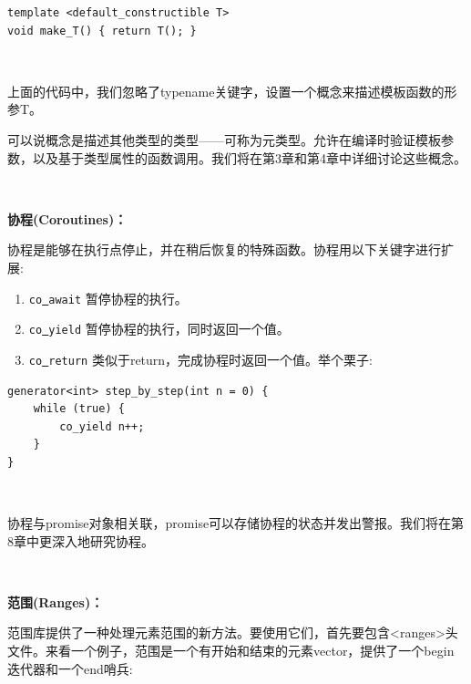 \begin{lstlisting}[caption={}]
template <default_constructible T>
void make_T() { return T(); }
\end{lstlisting}
	
\noindent\textbf{}\ \par
上面的代码中，我们忽略了typename关键字，设置一个概念来描述模板函数的形参T。\par

可以说概念是描述其他类型的类型——可称为元类型。允许在编译时验证模板参数，以及基于类型属性的函数调用。我们将在第3章和第4章中详细讨论这些概念。 \par

\noindent\textbf{}\ \par
\textbf{协程(Coroutines)：}\ \par
协程是能够在执行点停止，并在稍后恢复的特殊函数。协程用以下关键字进行扩展:\par

\begin{enumerate}
	\item \texttt{co\underline{ }await} 暂停协程的执行。
	\item \texttt{co\underline{ }yield} 暂停协程的执行，同时返回一个值。
	\item \texttt{co\underline{ }return} 类似于return，完成协程时返回一个值。举个栗子:
\end{enumerate}


\begin{lstlisting}[caption={}]
generator<int> step_by_step(int n = 0) {
	while (true) {
		co_yield n++;
	}
}
\end{lstlisting}

\noindent\textbf{}\ \par
协程与promise对象相关联，promise可以存储协程的状态并发出警报。我们将在第8章中更深入地研究协程。 \par
	
\noindent\textbf{}\ \par
\textbf{范围(Ranges)：}\ \par
范围库提供了一种处理元素范围的新方法。要使用它们，首先要包含<ranges>头文件。来看一个例子，范围是一个有开始和结束的元素vector，提供了一个begin迭代器和一个end哨兵:\par

